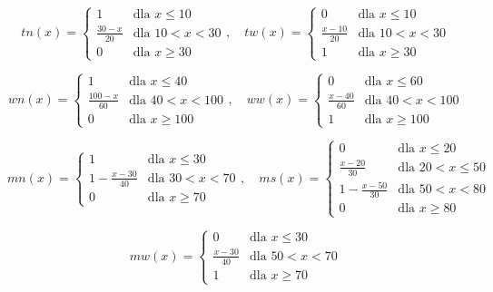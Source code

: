 \documentclass{article}
\begin{document}
\begin{equation*}
    tn(x) = \begin{cases}
        1 & \text{dla } x \leq 10 \\
        \frac{30 - x}{20} & \text{dla } 10 < x < 30 \\
        0 & \text{dla } x \geq 30
    \end{cases}, \quad
    tw(x) = \begin{cases}
        0 & \text{dla } x \leq 10 \\
        \frac{x - 10}{20} & \text{dla } 10 < x < 30 \\
        1 & \text{dla } x \geq 30
    \end{cases}
\end{equation*}

\begin{equation*}
    wn(x) = \begin{cases}
        1 & \text{dla } x \leq 40 \\
        \frac{100 - x}{60} & \text{dla } 40 < x < 100 \\
        0 & \text{dla } x \geq 100
    \end{cases}, \quad
    ww(x) = \begin{cases}
        0 & \text{dla } x \leq 60 \\
        \frac{x - 40}{60} & \text{dla } 40 < x < 100 \\
        1 & \text{dla } x \geq 100
    \end{cases}
\end{equation*}

\begin{equation*}
    mn(x) = \begin{cases}
        1 & \text{dla } x \leq 30 \\
        1 - \frac{x - 30}{40} & \text{dla } 30 < x < 70 \\
        0 & \text{dla } x \geq 70
    \end{cases}, \quad
    ms(x) = \begin{cases}
        0 & \text{dla } x \leq 20 \\
        \frac{x - 20}{30} & \text{dla } 20 < x \leq 50 \\
        1 - \frac{x - 50}{30} & \text{dla } 50 < x < 80 \\
        0 & \text{dla } x \geq 80
    \end{cases}
\end{equation*}

\begin{equation*}
    mw(x) = \begin{cases}
        0 & \text{dla } x \leq 30 \\
        \frac{x - 30}{40} & \text{dla } 50 < x < 70 \\
        1 & \text{dla } x \geq 70
    \end{cases}
\end{equation*}
\end{document}
